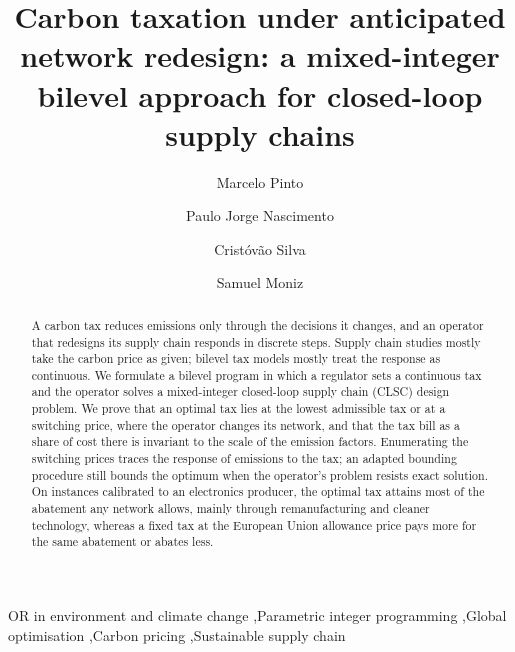 \documentclass[review,11pt,nonatbib]{elsarticle}
\theoremstyle{remark}
\begin{document}
\begin{frontmatter}

\title{Carbon taxation under anticipated network redesign: a mixed-integer bilevel approach for closed-loop supply chains}

\author[uc]{Marcelo Pinto}
\author[uc]{Paulo Jorge Nascimento}
\author[uc]{Crist\'{o}v\~{a}o Silva}
\author[uc]{Samuel Moniz}

\begin{abstract}
A carbon tax reduces emissions only through the decisions it changes, and an operator that redesigns its supply chain responds in discrete steps. Supply chain studies mostly take the carbon price as given; bilevel tax models mostly treat the response as continuous. We formulate a bilevel program in which a regulator sets a continuous tax and the operator solves a mixed-integer closed-loop supply chain (CLSC) design problem. We prove that an optimal tax lies at the lowest admissible tax or at a switching price, where the operator changes its network, and that the tax bill as a share of cost there is invariant to the scale of the emission factors. Enumerating the switching prices traces the response of emissions to the tax; an adapted bounding procedure still bounds the optimum when the operator's problem resists exact solution. On instances calibrated to an electronics producer, the optimal tax attains most of the abatement any network allows, mainly through remanufacturing and cleaner technology, whereas a fixed tax at the European Union allowance price pays more for the same abatement or abates less.
\end{abstract}

\begin{keyword}
OR in environment and climate change \sep Parametric integer programming \sep Global optimisation \sep Carbon pricing \sep Sustainable supply chain
\end{keyword}

\end{frontmatter}

\end{document}
